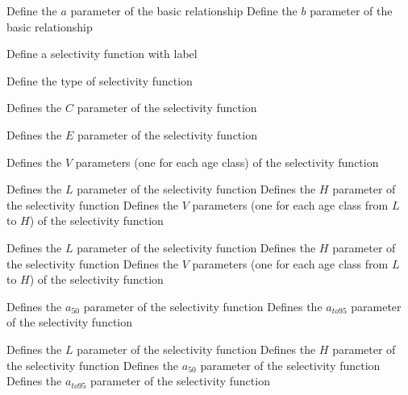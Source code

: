  {Define the $a$ parameter of the basic relationship}
 {Define the $b$ parameter of the basic relationship}
\par {} {Define a selectivity function with label}\par
{} {Define the type of selectivity function}
\par\textbf{}\par
{} {Defines the $C$ parameter of the selectivity function}
\par\textbf{}\par
{} {Defines the $E$ parameter of the selectivity function}
\par\textbf{}\par
{} {Defines the $V$ parameters (one for each age class) of the selectivity function}
\par\textbf{}\par
{} {Defines the $L$ parameter of the selectivity function}
 {Defines the $H$ parameter of the selectivity function}
 {Defines the $V$ parameters (one for each age class from $L$ to $H$) of the selectivity function}
\par\textbf{}\par
{} {Defines the $L$ parameter of the selectivity function}
 {Defines the $H$ parameter of the selectivity function}
 {Defines the $V$ parameters (one for each age class from $L$ to $H$) of the selectivity function}
\par\textbf{}\par
{} {Defines the $a_{50}$ parameter of the selectivity function}
 {Defines the $a_{to95}$ parameter of the selectivity function}
\par\textbf{}\par
{} {Defines the $L$ parameter of the selectivity function}
 {Defines the $H$ parameter of the selectivity function}
 {Defines the $a_{50}$ parameter of the selectivity function}
 {Defines the $a_{to95}$ parameter of the selectivity function}
\par\textbf{}\par
